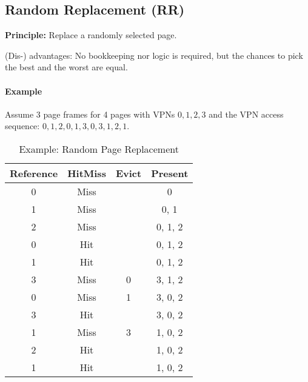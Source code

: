 \documentclass[a4paper, 11pt, accentcolor = tud3b]{tudreport}
\begin{document}

            \subsection{Random Replacement (RR)}
                \textbf{Principle:} Replace a randomly selected page.
                
                (Dis-) advantages: No bookkeeping nor logic is required, but the chances to pick the best and the worst are equal.
                
                \paragraph{Example}
	                Assume 3 page frames for 4 pages with VPNs \( 0, 1, 2, 3 \) and the VPN access sequence: \( 0, 1, 2, 0, 1, 3, 0, 3, 1, 2, 1 \).
	                \begin{table}[H]
	                	\centering
	                	\begin{tabular}{c|c|c|c}
	                		\textbf{Reference} & \textbf{Hit}\textbf{Miss} & \textbf{Evict} & \textbf{Present} \\ \hline
	                		        0          &           Miss            &                &        0         \\
	                		        1          &           Miss            &                &       0, 1       \\
	                		        2          &           Miss            &                &     0, 1, 2      \\
	                		        0          &            Hit            &                &     0, 1, 2      \\
	                		        1          &            Hit            &                &     0, 1, 2      \\
	                		        3          &           Miss            &       0        &     3, 1, 2      \\
	                		        0          &           Miss            &       1        &     3, 0, 2      \\
	                		        3          &            Hit            &                &     3, 0, 2      \\
	                		        1          &           Miss            &       3        &     1, 0, 2      \\
	                		        2          &            Hit            &                &     1, 0, 2      \\
	                		        1          &            Hit            &                &     1, 0, 2
	                	\end{tabular}
	                	\caption{Example: Random Page Replacement}
	                \end{table}
\end{document}
